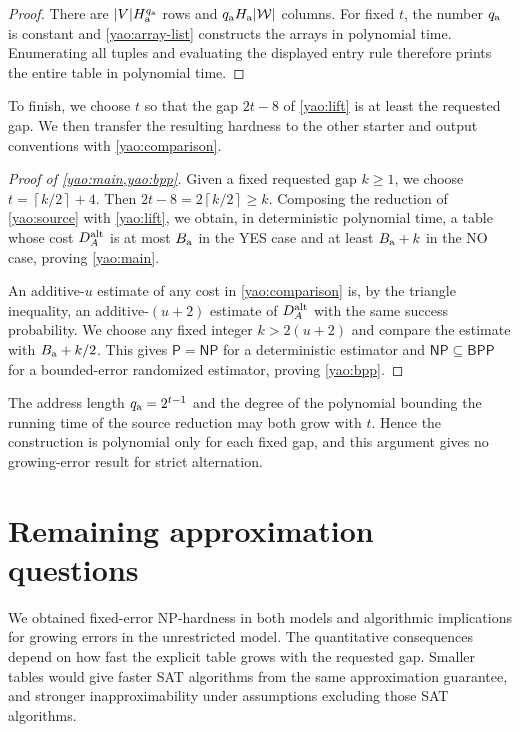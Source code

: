 \documentclass[11pt,letterpaper]{article} \usepackage[utf8]{inputenc}
\theoremstyle{plain} \newtheorem{theorem}{Theorem}[section]
\theoremstyle{definition} \newaliascnt{definition}{theorem}
\newcommand{\ceil}[1]{\left\lceil#1\right\rceil}
\newcommand{\NP}{\mathsf{NP}}
\newcommand{\BPP}{\mathsf{BPP}}
\begin{document}
\begin{proof}
There are $|V|H_{\rm a}^{q_{\rm a}}$ rows and
$q_{\rm a}H_{\rm a}|\mathcal W|$ columns. For fixed $t$, the number
$q_{\rm a}$ is constant and \cref{yao:array-list} constructs the arrays in
polynomial time. Enumerating all tuples and evaluating the displayed entry rule
therefore prints the entire table in polynomial time.
\end{proof}

To finish, we choose $t$ so that the gap $2t-8$ of \cref{yao:lift} is at least
the requested gap. We then transfer the resulting hardness to the other starter
and output conventions with \cref{yao:comparison}.

\begin{proof}[Proof of \cref{yao:main,yao:bpp}]
\label{proof:yao:main}\label{proof:yao:bpp}
Given a fixed requested gap $k\ge1$, we choose $t=\ceil{k/2}+4$. Then
$2t-8=2\ceil{k/2}\ge k$.
Composing the reduction of \cref{yao:source} with \cref{yao:lift}, we obtain,
in deterministic polynomial time, a table whose cost $D_A^{\rm alt}$ is at
most $B_{\rm a}$ in the YES case and at least $B_{\rm a}+k$ in the NO case, proving \cref{yao:main}.

An additive-$u$ estimate of any cost in \cref{yao:comparison} is, by the
triangle inequality, an additive-$(u+2)$ estimate of $D_A^{\rm alt}$ with the
same success probability. We choose any fixed integer $k>2(u+2)$ and compare
the estimate with $B_{\rm a}+k/2$. This gives
$\mathsf P=\NP$ for a deterministic estimator and $\NP\subseteq\BPP$ for a
bounded-error randomized estimator, proving \cref{yao:bpp}.
\end{proof}

The address length $q_{\rm a}=2^{t-1}$ and the degree of the polynomial
bounding the running time of the source reduction may both grow with $t$. Hence the construction is polynomial only for each
fixed gap, and this argument gives no growing-error result for strict
alternation.

\section{Remaining approximation questions}
\label{sec:conclusion}

We obtained fixed-error NP-hardness in both models and algorithmic implications
for growing errors in the unrestricted model. The quantitative consequences
depend on how fast the explicit table grows with the requested gap. Smaller
tables would give faster SAT algorithms from the same approximation guarantee,
and stronger inapproximability under assumptions excluding those SAT algorithms.
\end{document}
